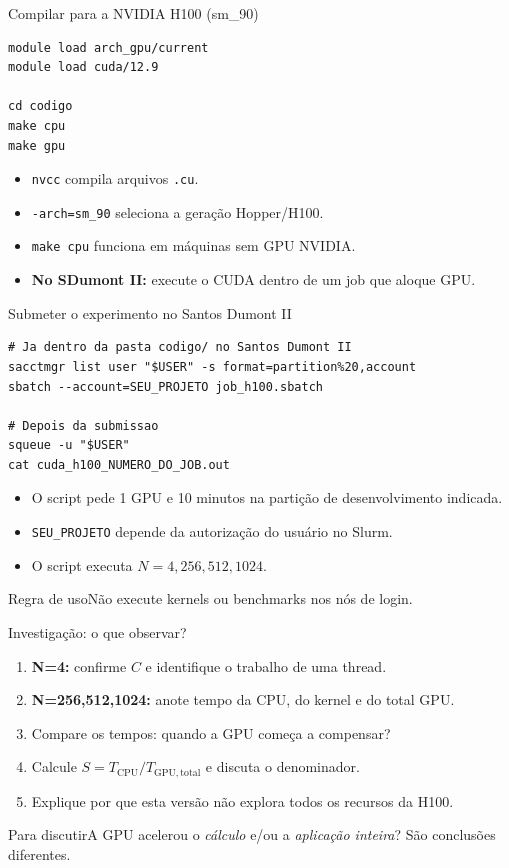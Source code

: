 \documentclass[aspectratio=169,11pt]{beamer}
\newcommand{\pergunta}[1]{\begin{alertblock}{Para discutir}#1\end{alertblock}}
\begin{document}
\begin{frame}[fragile]{Compilar para a NVIDIA H100 (sm\_90)}
\begin{lstlisting}[style=terminal]
module load arch_gpu/current
module load cuda/12.9

cd codigo
make cpu
make gpu
\end{lstlisting}
\begin{itemize}
\item \texttt{nvcc} compila arquivos \texttt{.cu}.
\item \texttt{-arch=sm\_90} seleciona a geração Hopper/H100.
\item \texttt{make cpu} funciona em máquinas sem GPU NVIDIA.
\item \textbf{No SDumont II:} execute o CUDA dentro de um job que aloque GPU.
\end{itemize}
\end{frame}

\begin{frame}[fragile]{Submeter o experimento no Santos Dumont II}
\begin{lstlisting}[style=terminal]
# Ja dentro da pasta codigo/ no Santos Dumont II
sacctmgr list user "$USER" -s format=partition%20,account
sbatch --account=SEU_PROJETO job_h100.sbatch

# Depois da submissao
squeue -u "$USER"
cat cuda_h100_NUMERO_DO_JOB.out
\end{lstlisting}
\begin{itemize}
\item O script pede 1 GPU e 10 minutos na partição de desenvolvimento indicada.
\item \texttt{SEU\_PROJETO} depende da autorização do usuário no Slurm.
\item O script executa \(N=4,256,512,1024\).
\end{itemize}
\begin{alertblock}{Regra de uso}Não execute kernels ou benchmarks nos nós de login.\end{alertblock}
\end{frame}

\begin{frame}{Investigação: o que observar?}
\begin{enumerate}
\item \textbf{N=4:} confirme \(C\) e identifique o trabalho de uma thread.
\item \textbf{N=256,512,1024:} anote tempo da CPU, do kernel e do total GPU.
\item Compare os tempos: quando a GPU começa a compensar?
\item Calcule \(S=T_{\mathrm{CPU}}/T_{\mathrm{GPU,total}}\) e discuta o denominador.
\item Explique por que esta versão não explora todos os recursos da H100.
\end{enumerate}
\pergunta{A GPU acelerou o \emph{cálculo} e/ou a \emph{aplicação inteira}? São conclusões diferentes.}
\end{frame}
\end{document}
